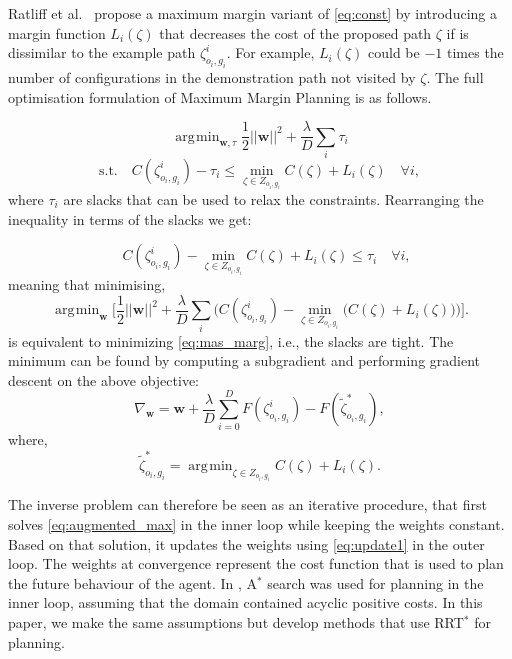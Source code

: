 \documentclass{article}  %
\DeclareMathOperator*{\argmin}{\arg\!\min}
\begin{document}
Ratliff et al.\ \cite{ratliff2006maximum} propose a maximum margin variant of \eqref{eq:const} by introducing a margin function $L_i(\zeta)$ that decreases the cost of the proposed path $\zeta$ if is dissimilar to the example path $\zeta^i_{o_i,g_i}$. For example, $L_i(\zeta)$ could be $-1$ times the number of configurations in the demonstration path not visited by $\zeta$. The full optimisation formulation of Maximum Margin Planning is as follows.

\begin{equation}
	\argmin_{\mathbf{w},\tau} \frac{1}{2}||\mathbf{w}||^2 + \frac{\lambda}{D} \sum_i \tau_i \label{eq:mas_marg}
\end{equation}
\begin{equation}
	\text{s.t.} \quad C(\zeta^i_{o_i,g_i}) - \tau_i \leq \min_{\zeta \in Z_{o_i,g_i}} C(\zeta) + L_i(\zeta) \quad \forall i,
\end{equation}
where $\tau_i$ are slacks that can be used to relax the constraints. Rearranging the inequality in terms of the slacks we get:

\begin{equation}
	 \quad C(\zeta^i_{o_i,g_i}) - \min_{\zeta \in Z_{o_i,g_i}} C(\zeta) + L_i(\zeta)  \leq \tau_i  \quad \forall i,
\end{equation}
meaning that minimising,
\begin{equation}
	\argmin_{\mathbf{w}} \big[ \frac{1}{2}||\mathbf{w}||^2 + \frac{\lambda}{D} \sum_i \big( C(\zeta^i_{o_i,g_i}) - \min_{\zeta \in Z_{o_i,g_i}}\big(C(\zeta) + L_i(\zeta)\big) \big) \big]. \label{eq:unconstrained}
\end{equation}
is equivalent to minimizing \eqref{eq:mas_marg}, i.e., the slacks are tight.
The minimum can be found by computing a subgradient and performing gradient descent on the above objective:
\begin{equation}
	\nabla_{\mathbf{w}} =\mathbf{w} +  \frac{\lambda}{D} \sum_{i=0}^D F(\zeta^i_{o_i,g_i}) - F(\tilde{\zeta}^*_{o_i,g_i}), \label{eq:update1}
\end{equation}
where,
\begin{equation}
	\tilde{\zeta}^*_{o_i,g_i} = \argmin_{\zeta \in Z_{o_i,g_i}} C(\zeta) + L_i(\zeta). \label{eq:augmented_max}
\end{equation}

The inverse problem can therefore be seen as an iterative procedure, that first solves \eqref{eq:augmented_max} in the inner loop while keeping the weights constant. Based on that solution, it updates the weights using \eqref{eq:update1} in the outer loop. The weights at convergence represent the cost function that is used to plan the future behaviour of the agent. In \cite{ratliff2006maximum}, A$^*$ search was used for planning in the inner loop, assuming that the domain contained acyclic positive costs. In this paper, we make the same assumptions but develop methods that use RRT$^*$ for planning.
\end{document}
